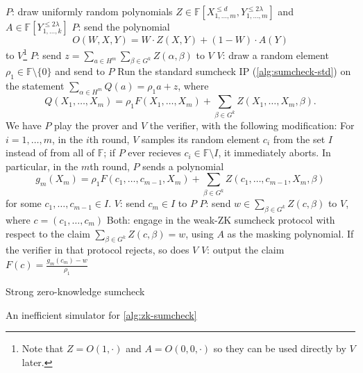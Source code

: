 \documentclass[english]{reedthesis}
\theoremstyle{plain}
\theoremstyle{definition}
\theoremstyle{remark}
\begin{document}
\begin{algorithm}[H]
  $P$: draw uniformly random polynomials
  $Z \in \mathbb{F}[X_{1, \ldots, m}^{\le d}, Y_{1, \ldots, m}^{\le 2\lambda}]$ and
  $A \in \mathbb{F}[Y_{1, \ldots, k}^{\le 2\lambda}]$\;
  $P$: send the polynomial
  \[
    O(W, X, Y) = W \cdot Z(X, Y) + (1 - W) \cdot A(Y)
  \]
  to $V$\footnote{Note that $Z = O(1, \cdot)$ and $A = O(0, 0, \cdot)$ so they can be
    used directly by $V$ later.}\;
  $P$: send $z = \sum_{a \in H^{m}}\sum_{\beta \in G^{k}}Z(\alpha, \beta)$ to $V$\;
  $V$: draw a random element $\rho_{1} \in \mathbb{F} \setminus \{0\}$ and send to $P$\;
  Run the standard sumcheck IP (\cref{alg:sumcheck-std}) on the statement
  $\sum_{\alpha \in H^{m}}Q(a) = \rho_{1}a + z$, where
  \[
    Q(X_{1}, \ldots, X_{m}) = \rho_{1}F(X_{1}, \ldots, X_{m}) + \sum_{\beta \in G^{k}}Z(X_{1}, \ldots, X_{m}, \beta).
  \]
  We have $P$ play the prover and $V$ the verifier, with the following
  modification: For $i = 1, \ldots, m$, in the $i$th round, $V$ samples its random
  element $c_{i}$ from the set $I$ instead of from all of $\mathbb{F}$; if $P$
  ever recieves $c_{i} \in \mathbb{F} \setminus I$, it immediately aborts. In particular,
  in the $m$th round, $P$ sends a polynomial
  \[
    g_{m}(X_{m}) = \rho_{1}F(c_{1}, \ldots, c_{m-1}, X_{m}) + \sum_{\beta \in G^{k}}Z(c_{1}, \ldots, c_{m-1}, X_{m}, \beta)
  \]
  for some $c_{1}, \ldots, c_{m-1} \in I$.\;
  $V$: send $c_{m} \in I$ to $P$\;
  $P$: send $w \in \sum_{\beta \in G^{k}}Z(c, \beta)$ to $V$, where $c = (c_{1}, \ldots, c_{m})$\;
  Both: engage in the weak-ZK sumcheck protocol with respect to the claim
  $\sum_{\beta \in G^{k}}Z(c, \beta) = w$, using $A$ as the masking polynomial. If the
  verifier in that protocol rejects, so does $V$\;
  $V$: output the claim $F(c) = \frac{g_{m}(c_{m}) - w}{\rho_{1}}$\;
  \caption{Strong zero-knowledge sumcheck~\cite[Construction 3]{CFGS22}}\label{alg:zk-sumcheck}
\end{algorithm}

\begin{algorithm}[H]
  \caption{An inefficient simulator for
    \cref{alg:zk-sumcheck}~\cite[p.\ 15:33]{CFGS22}}\label{alg:zk-sumcheck-sim}
\end{algorithm}
\end{document}
